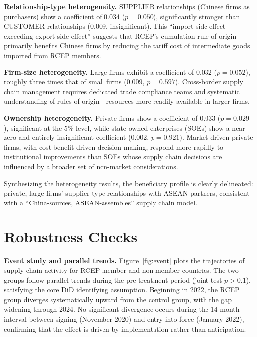 \documentclass[preprint,12pt,authoryear]{elsarticle}
\begin{document}
\textbf{Relationship-type heterogeneity.} SUPPLIER relationships (Chinese firms as purchasers) show a coefficient of 0.034 ($p=0.050$), significantly stronger than CUSTOMER relationships (0.009, insignificant). This ``import-side effect exceeding export-side effect'' suggests that RCEP's cumulation rule of origin primarily benefits Chinese firms by reducing the tariff cost of intermediate goods imported from RCEP members.

\textbf{Firm-size heterogeneity.} Large firms exhibit a coefficient of 0.032 ($p=0.052$), roughly three times that of small firms (0.009, $p=0.597$). Cross-border supply chain management requires dedicated trade compliance teams and systematic understanding of rules of origin—resources more readily available in larger firms.

\textbf{Ownership heterogeneity.} Private firms show a coefficient of 0.033 ($p=0.029$), significant at the 5\% level, while state-owned enterprises (SOEs) show a near-zero and entirely insignificant coefficient (0.002, $p=0.921$). Market-driven private firms, with cost-benefit-driven decision making, respond more rapidly to institutional improvements than SOEs whose supply chain decisions are influenced by a broader set of non-market considerations.

Synthesizing the heterogeneity results, the beneficiary profile is clearly delineated: private, large firms' supplier-type relationships with ASEAN partners, consistent with a ``China-sources, ASEAN-assembles'' supply chain model.

\section{Robustness Checks}
\label{sec:robustness}



\textbf{Event study and parallel trends.} Figure~\ref{fig:event} plots the trajectories of supply chain activity for RCEP-member and non-member countries. The two groups follow parallel trends during the pre-treatment period (joint test $p>0.1$), satisfying the core DiD identifying assumption. Beginning in 2022, the RCEP group diverges systematically upward from the control group, with the gap widening through 2024. No significant divergence occurs during the 14-month interval between signing (November 2020) and entry into force (January 2022), confirming that the effect is driven by implementation rather than anticipation.
\end{document}
